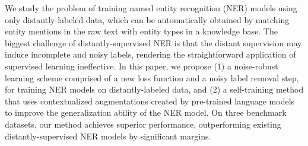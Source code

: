 We study the problem of training named entity recognition (NER) models using only distantly-labeled data, which can be automatically obtained by matching entity mentions in the raw text with entity types in a knowledge base. The biggest challenge of distantly-supervised NER is that the distant supervision may induce incomplete and noisy labels, rendering the straightforward application of supervised learning ineffective. In this paper, we propose (1) a noise-robust learning scheme comprised of a new loss function and a noisy label removal step, for training NER models on distantly-labeled data, and (2) a self-training method that uses contextualized augmentations created by pre-trained language models to improve the generalization ability of the NER model. On three benchmark datasets, our method achieves superior performance, outperforming existing distantly-supervised NER models by significant margins.
